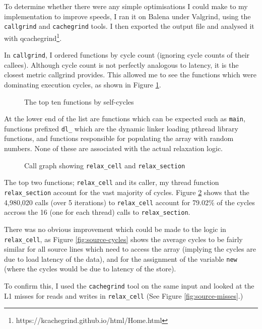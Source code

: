 \documentclass[12pt]{article}
\begin{document}
To determine whether there were any simple optimisations I could make to my implementation to improve speeds, I ran it on Balena under Valgrind, using the \texttt{callgrind} and \texttt{cachegrind} tools. I then exported the output file and analysed it with qcachegrind\footnote{https://kcachegrind.github.io/html/Home.html}.

In \texttt{callgrind}, I ordered functions by cycle count (ignoring cycle counts of their callees). Although cycle count is not perfectly analogous to latency, it is the closest metric callgrind provides. This allowed me to see the functions which were dominating execution cycles, as shown in Figure \ref{fig:top-cycles}.
\begin{figure}[!h]
\centering
\caption{The top ten functions by self-cycles}
\label{fig:top-cycles}
\end{figure}
At the lower end of the list are functions which can be expected such as \texttt{main}, functions prefixed \texttt{dl\_} which are the dynamic linker loading pthread library functions, and functions responsible for populating the array with random numbers. None of these are associated with the actual relaxation logic. 

\begin{figure}[htbp!]
\caption{Call graph showing \texttt{relax\_cell} and \texttt{relax\_section}}
\label{fig:cg}
\end{figure}

The top two functions; \texttt{relax\_cell} and its caller, my thread function \texttt{relax\_section} account for the vast majority of cycles. Figure \ref{fig:cg} shows that the 4,980,020 calls (over 5 iterations) to \texttt{relax\_cell} account for 79.02\% of the cycles accross the 16 (one for each thread) calls to  \texttt{relax\_section}.

There was no obvious improvement which could be made to the logic in \texttt{relax\_cell}, as Figure \ref{fig:source-cycles} shows the average cycles to be fairly similar for all source lines which need to access the array (implying the cycles are due to load latency of the data), and for the assignment of the variable \texttt{new} (where the cycles would be due to latency of the store).

To confirm this, I used the \texttt{cachegrind} tool on the same input and looked at the L1 misses for reads and writes in \texttt{relax\_cell} (See Figure \ref{fig:source-misses}.)
\end{document}
